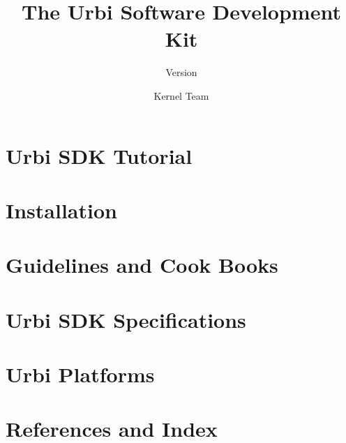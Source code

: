 \documentclass[openright,twoside,11pt]{book}
\title{The Urbi Software Development Kit}
\subtitle{Version \VcsDescription}
\author{Kernel Team}
\begin{document}
\maketitle



\tableofcontents

\part{Urbi SDK Tutorial}
\label{part:tut}





\part{Installation}
\label{part:install}


\part{Guidelines and Cook Books}
\label{part:guide}



\part{Urbi SDK Specifications}
\label{part:specs}


\part{Urbi Platforms}
\label{part:platforms}


\part{References and Index}
\label{part:ref}

\printindex
\end{document}
